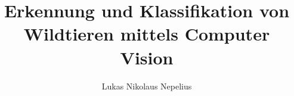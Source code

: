 \documentclass[bachelor,german,smartquotes]{hgbthesis}
\title{Erkennung und Klassifikation von Wildtieren mittels Computer Vision}
\author{Lukas Nikolaus Nepelius}
\begin{document}

\frontmatter                                       %

\maketitle
\tableofcontents


			

\mainmatter                             %





\appendix                                                               %


\backmatter                          %

\MakeBibliography %




\end{document}

